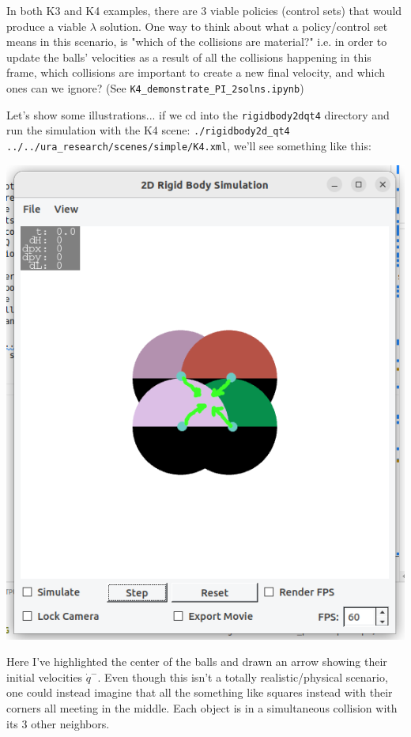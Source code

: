 \documentclass[12pt]{article}
\begin{document}
In both K3 and K4 examples, there are 3 viable policies (control sets) that would produce a viable $\lambda$ solution.
One way to think about what a policy/control set means in this scenario,
is "which of the collisions are material?"
i.e. in order to update the balls' velocities as a result of all the collisions happening in this frame,
which collisions are important to create a new final velocity, and which ones can we ignore?
(See \texttt{K4\_demonstrate\_PI\_2solns.ipynb})

Let's show some illustrations... if we cd into the \texttt{rigidbody2dqt4} directory and
run the simulation with the K4 scene: \texttt{./rigidbody2d\_qt4 ../../ura\_research/scenes/simple/K4.xml},
we'll see something like this:

\includegraphics[scale=0.5]{K4_1}

Here I've highlighted the center of the balls and drawn an arrow showing their initial velocities $\dot q^-$.
Even though this isn't a totally realistic/physical scenario, one could instead imagine that all the
something like squares instead with their corners all meeting in the middle. Each object is in 
a simultaneous collision with its 3 other neighbors.
\end{document}

